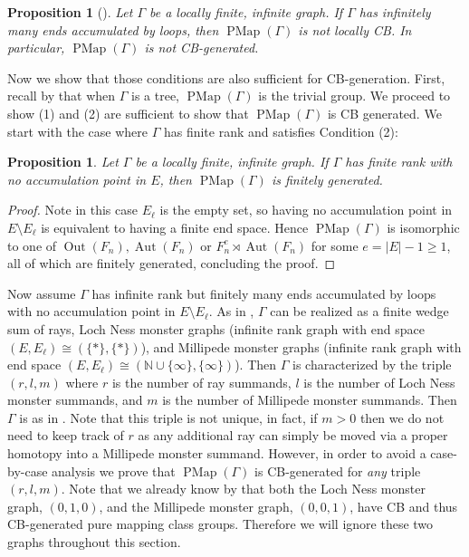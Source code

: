 \documentclass[11pt]{amsart}
\theoremstyle{plain}
\newtheorem{PROP}[THM]{Proposition}
\theoremstyle{definition}
\DeclareMathOperator{\Aut}{Aut}
\DeclareMathOperator{\Out}{Out}
\DeclareMathOperator{\PMap}{PMap}
\newcommand{\N}{\mathbb{N}}
\def\G{{\Gamma}}
\newcommand{\<}{\langle}
\renewcommand{\>}{\rangle}
\begin{document}
\begin{PROP}[{\cite[Theorem 8.2]{DHK2023}}]\label{prop:nonCBgenInfEell}
    Let $\G$ be a locally finite, infinite graph. If $\G$ has infinitely many ends accumulated by loops, then $\PMap(\G)$ is not locally CB. In particular, $\PMap(\G)$ is not CB-generated.
\end{PROP}

Now we show that those conditions are also sufficient for CB-generation.
First, recall by  that when $\G$ is a tree, $\PMap(\G)$ is the trivial group.
We proceed to show (1) and (2) are sufficient to show that $\PMap(\G)$ is CB
generated. We start with the case where $\G$ has finite rank and satisfies Condition (2):

\begin{PROP}\label{prop:CBgenFinite}
       Let $\G$ be a locally finite, infinite graph. If $\G$ has finite rank with no accumulation point in $E$, then $\PMap(\G)$ is finitely generated.
\end{PROP}

\begin{proof}
    Note in this case $E_\ell$ is the empty set, so having no accumulation point in
    $E \setminus E_\ell$ is equivalent to having a finite end space. Hence $\PMap(\G)$ is isomorphic to one of $\Out(F_n), \Aut(F_n)$ or $F_n^e \rtimes \Aut(F_n)$ for some $e=|E|-1 \ge 1$, all of which are finitely generated, concluding the proof.
\end{proof}

Now assume $\G$ has infinite rank but finitely many ends accumulated by loops
with no accumulation point in $E \setminus E_\ell$. As in , $\G$ can be realized as a finite wedge sum of rays, Loch Ness monster graphs (infinite rank graph with end space $(E,E_{\ell}) \cong (\{*\},\{*\})$), and Millipede monster graphs (infinite rank graph with end space $(E,E_{\ell}) \cong (\N \cup \{\infty\}, \{\infty\})$).  
Then $\G$ is characterized by the triple $(r,l,m)$ where $r$ is the number of ray summands, $l$ is the number of Loch Ness monster summands, and $m$ is the number of Millipede monster summands. Then $\G$ is as in . Note that this triple is not unique, in fact, if $m>0$ then we do not need to keep track of $r$ as any additional ray can simply be moved via a proper homotopy into a Millipede monster summand. However, in order to avoid a case-by-case analysis we prove that $\PMap(\G)$ is CB-generated for \emph{any} triple $(r,l,m)$.  Note that we already know by  that both the Loch Ness monster graph, $(0,1,0)$, and the Millipede monster graph, $(0,0,1)$, have CB and thus CB-generated pure mapping class groups. Therefore we will ignore these two graphs throughout this section.
\end{document}
